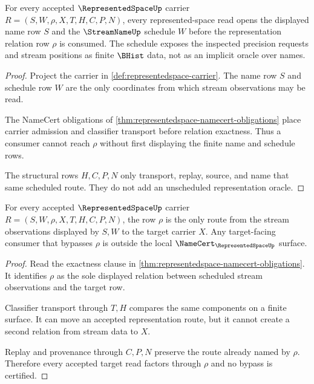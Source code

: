 \begin{theorem}
\label{thm:representedspace-name-schedule-obligation}
For every accepted $\RepresentedSpaceUp$ carrier $R=(S,W,\rho,X,T,H,C,P,N)$, every represented-space read opens the displayed name row $S$ and the $\StreamNameUp$ schedule $W$ before the representation relation row $\rho$ is consumed. The schedule exposes the inspected precision requests and stream positions as finite $\BHist$ data, not as an implicit oracle over names.
\end{theorem}
\begin{proof}
Project the carrier in \autoref{def:representedspace-carrier}. The name row $S$ and schedule row $W$ are the only coordinates from which stream observations may be read.

The NameCert obligations of \autoref{thm:representedspace-namecert-obligations} place carrier admission and classifier transport before relation exactness. Thus a consumer cannot reach $\rho$ without first displaying the finite name and schedule rows.

The structural rows $H,C,P,N$ only transport, replay, source, and name that same scheduled route. They do not add an unscheduled representation oracle.
\end{proof}

\begin{theorem}
\label{thm:representedspace-representation-relation-exactness}
For every accepted $\RepresentedSpaceUp$ carrier $R=(S,W,\rho,X,T,H,C,P,N)$, the row $\rho$ is the only route from the stream observations displayed by $S,W$ to the target carrier $X$. Any target-facing consumer that bypasses $\rho$ is outside the local $\NameCert_{\RepresentedSpaceUp}$ surface.
\end{theorem}
\begin{proof}
Read the exactness clause in \autoref{thm:representedspace-namecert-obligations}. It identifies $\rho$ as the sole displayed relation between scheduled stream observations and the target row.

Classifier transport through $T,H$ compares the same components on a finite surface. It can move an accepted representation route, but it cannot create a second relation from stream data to $X$.

Replay and provenance through $C,P,N$ preserve the route already named by $\rho$. Therefore every accepted target read factors through $\rho$ and no bypass is certified.
\end{proof}

